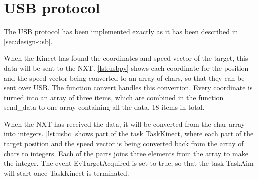 \section{USB protocol}
The USB protocol has been implemented exactly as it has been described in \autoref{sec:design-usb}.

When the Kinect has found the coordinates and speed vector of the target, this data will be sent to the NXT. \autoref{lst:usbpy} shows each coordinate for the position and the speed vector being converted to an array of chars, so that they can be sent over USB. The function convert handles this convertion. Every coordinate is turned into an array of three items, which are combined in the function send\_data to one array containing all the data, 18 items in total. 



When the NXT has received the data, it will be converted from the char array into integers. \autoref{lst:usbc} shows part of the task TaskKinect, where each part of the target position and the speed vector is being converted back from the array of chars to integers. Each of the parts joins three elements from the array to make the integer. 
The event EvTargetAcquired is set to true, so that the task TaskAim will start once TaskKinect is terminated.

